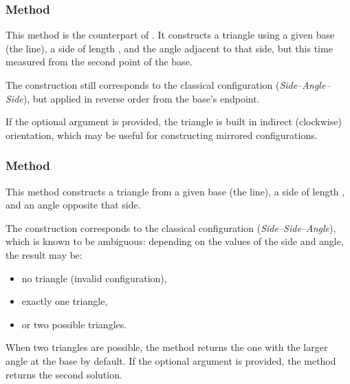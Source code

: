 
\subsubsection{Method } %
\label{ssub:_line__as_d_an_swap}

This method is the counterpart of . It constructs a triangle using a given base (the line), a side of length , and the angle  adjacent to that side, but this time measured from the second point  of the base.

\medskip
\noindent
The construction still corresponds to the classical  configuration (\textit{Side–Angle–Side}), but applied in reverse order from the base's endpoint.

\medskip
\noindent
If the optional argument  is provided, the triangle is built in indirect (clockwise) orientation, which may be useful for constructing mirrored configurations.



\subsubsection{Method } %
\label{ssub:_line_ssa_d_an_swap}

This method constructs a triangle from a given base (the line), a side of length , and an angle  opposite that side.

\medskip
\noindent
The construction corresponds to the classical  configuration (\emph{Side–Side–Angle}), which is known to be ambiguous: depending on the values of the side and angle, the result may be:

\begin{itemize}
  \item no triangle (invalid configuration),
  \item exactly one triangle,
  \item or two possible triangles.
\end{itemize}

\medskip
\noindent
When two triangles are possible, the method returns the one with the larger angle at the base by default. If the optional argument  is provided, the method returns the second solution.

\vspace{1em}

